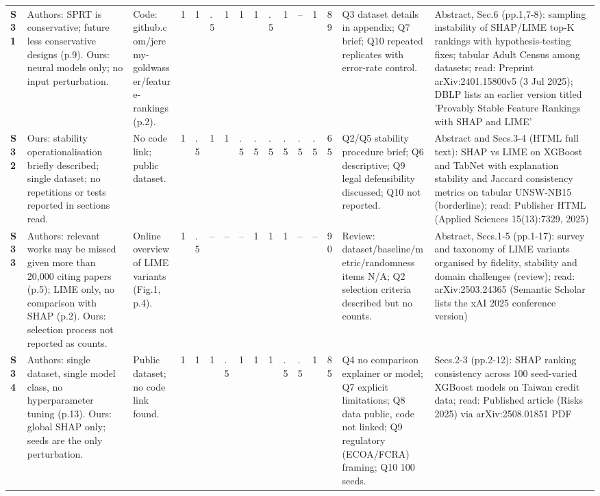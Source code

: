 \begin{longtable}{@{}P{1.0cm}P{4.6cm}P{3.6cm}P{0.3cm}P{0.3cm}P{0.3cm}P{0.3cm}P{0.3cm}P{0.3cm}P{0.3cm}P{0.3cm}P{0.3cm}P{0.36cm}P{0.75cm}P{3.0cm}P{3.9cm}@{}}
\textbf{S31} & Authors: SPRT is conservative; future less conservative designs (p.9). Ours: neural models only; no input perturbation. & Code: github.com/\allowbreak{}jeremy-goldwasser/\allowbreak{}feature-rankings (p.2). & 1 & 1 & .5 & 1 & 1 & 1 & .5 & 1 & -- & 1 & 89 & Q3 dataset details in appendix; Q7 brief; Q10 repeated replicates with error-rate control. & Abstract, Sec.6 (pp.1,7-8): sampling instability of SHAP/\allowbreak{}LIME top-K rankings with hypothesis-testing fixes; tabular Adult Census among datasets; read: Preprint arXiv:2401.15800v5 (3 Jul 2025); DBLP lists an earlier version titled 'Provably Stable Feature Rankings with SHAP and LIME' \\
\textbf{S32} & Ours: stability operationalisation briefly described; single dataset; no repetitions or tests reported in sections read. & No code link; public dataset. & 1 & .5 & 1 & 1 & .5 & .5 & .5 & .5 & .5 & .5 & 65 & Q2/\allowbreak{}Q5 stability procedure brief; Q6 descriptive; Q9 legal defensibility discussed; Q10 not reported. & Abstract and Secs.3-4 (HTML full text): SHAP vs LIME on XGBoost and TabNet with explanation stability and Jaccard consistency metrics on tabular UNSW-NB15 (borderline); read: Publisher HTML (Applied Sciences 15(13):7329, 2025) \\
\textbf{S33} & Authors: relevant works may be missed given more than 20,000 citing papers (p.5); LIME only, no comparison with SHAP (p.2). Ours: selection process not reported as counts. & Online overview of LIME variants (Fig.1, p.4). & 1 & .5 & -- & -- & -- & 1 & 1 & 1 & -- & -- & 90 & Review: dataset/\allowbreak{}baseline/\allowbreak{}metric/\allowbreak{}randomness items N/\allowbreak{}A; Q2 selection criteria described but no counts. & Abstract, Secs.1-5 (pp.1-17): survey and taxonomy of LIME variants organised by fidelity, stability and domain challenges (review); read: arXiv:2503.24365 (Semantic Scholar lists the xAI 2025 conference version) \\
\textbf{S34} & Authors: single dataset, single model class, no hyperparameter tuning (p.13). Ours: global SHAP only; seeds are the only perturbation. & Public dataset; no code link found. & 1 & 1 & 1 & .5 & 1 & 1 & 1 & .5 & .5 & 1 & 85 & Q4 no comparison explainer or model; Q7 explicit limitations; Q8 data public, code not linked; Q9 regulatory (ECOA/\allowbreak{}FCRA) framing; Q10 100 seeds. & Secs.2-3 (pp.2-12): SHAP ranking consistency across 100 seed-varied XGBoost models on Taiwan credit data; read: Published article (Risks 2025) via arXiv:2508.01851 PDF \\

\end{longtable}
